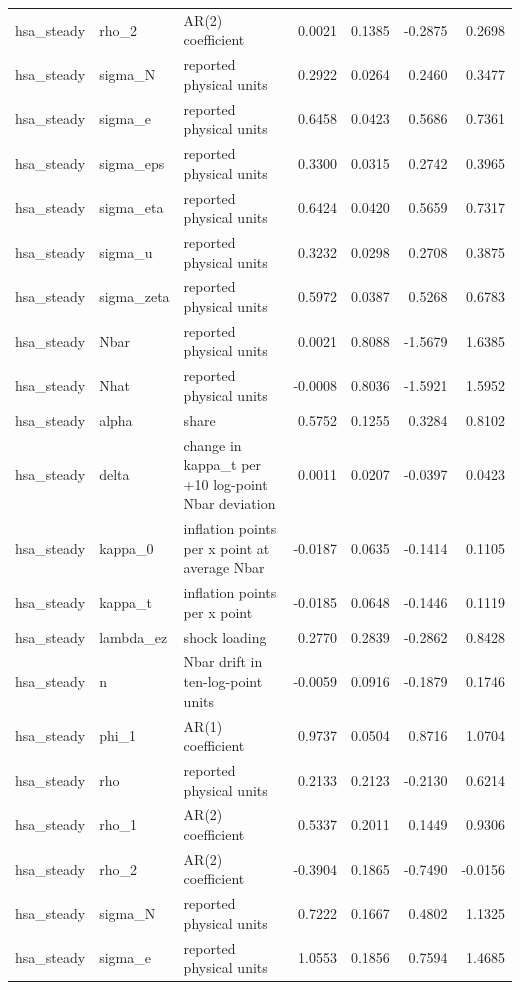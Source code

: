 \begin{tabular}{lllrrrr}
hsa\_steady & rho\_2 & AR(2) coefficient & 0.0021 & 0.1385 & -0.2875 & 0.2698 \\
hsa\_steady & sigma\_N & reported physical units & 0.2922 & 0.0264 & 0.2460 & 0.3477 \\
hsa\_steady & sigma\_e & reported physical units & 0.6458 & 0.0423 & 0.5686 & 0.7361 \\
hsa\_steady & sigma\_eps & reported physical units & 0.3300 & 0.0315 & 0.2742 & 0.3965 \\
hsa\_steady & sigma\_eta & reported physical units & 0.6424 & 0.0420 & 0.5659 & 0.7317 \\
hsa\_steady & sigma\_u & reported physical units & 0.3232 & 0.0298 & 0.2708 & 0.3875 \\
hsa\_steady & sigma\_zeta & reported physical units & 0.5972 & 0.0387 & 0.5268 & 0.6783 \\
hsa\_steady & Nbar & reported physical units & 0.0021 & 0.8088 & -1.5679 & 1.6385 \\
hsa\_steady & Nhat & reported physical units & -0.0008 & 0.8036 & -1.5921 & 1.5952 \\
hsa\_steady & alpha & share & 0.5752 & 0.1255 & 0.3284 & 0.8102 \\
hsa\_steady & delta & change in kappa\_t per +10 log-point Nbar deviation & 0.0011 & 0.0207 & -0.0397 & 0.0423 \\
hsa\_steady & kappa\_0 & inflation points per x point at average Nbar & -0.0187 & 0.0635 & -0.1414 & 0.1105 \\
hsa\_steady & kappa\_t & inflation points per x point & -0.0185 & 0.0648 & -0.1446 & 0.1119 \\
hsa\_steady & lambda\_ez & shock loading & 0.2770 & 0.2839 & -0.2862 & 0.8428 \\
hsa\_steady & n & Nbar drift in ten-log-point units & -0.0059 & 0.0916 & -0.1879 & 0.1746 \\
hsa\_steady & phi\_1 & AR(1) coefficient & 0.9737 & 0.0504 & 0.8716 & 1.0704 \\
hsa\_steady & rho & reported physical units & 0.2133 & 0.2123 & -0.2130 & 0.6214 \\
hsa\_steady & rho\_1 & AR(2) coefficient & 0.5337 & 0.2011 & 0.1449 & 0.9306 \\
hsa\_steady & rho\_2 & AR(2) coefficient & -0.3904 & 0.1865 & -0.7490 & -0.0156 \\
hsa\_steady & sigma\_N & reported physical units & 0.7222 & 0.1667 & 0.4802 & 1.1325 \\
hsa\_steady & sigma\_e & reported physical units & 1.0553 & 0.1856 & 0.7594 & 1.4685 \\

\end{tabular}
